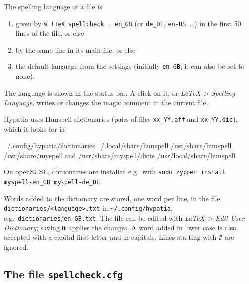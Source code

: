 \documentclass[11pt]{article}
\newcommand{\menu}[1]{\textsf{\textit{#1}}}
\newcommand{\file}[1]{\texttt{#1}}
\newcommand{\cfgdir}{\texttt{\textasciitilde/.config/hypatia}}
\begin{document}
    The spelling language of a file is
    \begin{enumerate}
        \itemsep-1mm
        \item given by \verb+% !TeX spellcheck = en_GB+ (or \verb+de_DE+, \verb+en-US+, \ldots) in the first 50 lines of the file, or else
        \item by the same line in its main file, or else
        \item the default language from the settings (initially \verb+en_GB+; it can also be set to none).
    \end{enumerate}
    The language is shown in the status bar. A click on it, or \menu{LaTeX > Spelling Language}, writes or changes the magic comment in the current file.

    Hypatia uses Hunspell dictionaries (pairs of files \verb+xx_YY.aff+ and \verb+xx_YY.dic+), which it looks for in
    \begin{Code}
~/.config/hypatia/dictionaries
~/.local/share/hunspell
/usr/share/hunspell
/usr/share/myspell  and  /usr/share/myspell/dicts
/usr/local/share/hunspell
    \end{Code}
    On openSUSE, dictionaries are installed e.g.\ with \verb+sudo zypper install myspell-en_GB myspell-de_DE+.

    Words added to the dictionary are stored, one word per line, in the file \file{dictionaries/<language>.txt} in \cfgdir, e.g.\ \file{dictionaries/en\_GB.txt}. The file can be edited with \menu{LaTeX > Edit User Dictionary}; saving it applies the changes. A word added in lower case is also accepted with a capital first letter and in capitals. Lines starting with \verb+#+ are ignored.

    \subsection{The file \file{spellcheck.cfg}}
\end{document}
